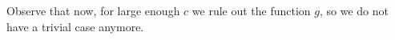 Observe that now, for large enough $c$ we rule out the function $g$, so we do not have a trivial case anymore.
%
